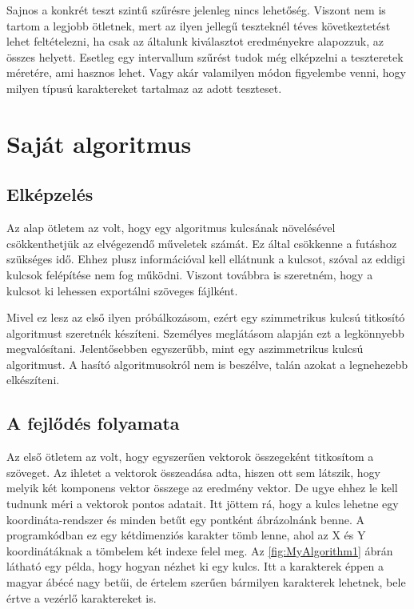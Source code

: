 \documentclass[12pt]{report} %
\begin{document}
Sajnos a konkrét teszt szintű szűrésre jelenleg nincs lehetőség. Viszont nem is tartom a legjobb ötletnek, mert az ilyen jellegű teszteknél téves következtetést lehet feltételezni, ha csak az általunk kiválasztot eredményekre alapozzuk, az összes helyett. Esetleg egy intervallum szűrést tudok még elképzelni a teszteretek méretére, ami hasznos lehet. Vagy akár valamilyen módon figyelembe venni, hogy milyen típusú karaktereket tartalmaz az adott teszteset.

\chapter{Saját algoritmus} %

\section{Elképzelés} %

Az alap ötletem az volt, hogy egy algoritmus kulcsának növelésével csökkenthetjük az elvégezendő műveletek számát. Ez által csökkenne a futáshoz szükséges idő. Ehhez plusz információval kell ellátnunk a kulcsot, szóval az eddigi kulcsok felépítése nem fog működni. Viszont továbbra is szeretném, hogy a kulcsot ki lehessen exportálni szöveges fájlként.

Mivel ez lesz az első ilyen próbálkozásom, ezért egy szimmetrikus kulcsú titkosító algoritmust szeretnék készíteni. Személyes meglátásom alapján ezt a legkönnyebb megvalósítani. Jelentősebben egyszerűbb, mint egy aszimmetrikus kulcsú algoritmust. A hasító algoritmusokról nem is beszélve, talán azokat a legnehezebb elkészíteni.

\section{A fejlődés folyamata} %

Az első ötletem az volt, hogy egyszerűen vektorok összegeként titkosítom a szöveget. Az ihletet a vektorok összeadása adta, hiszen ott sem látszik, hogy melyik két komponens vektor összege az eredmény vektor. De ugye ehhez le kell tudnunk méri a vektorok pontos adatait. Itt jöttem rá, hogy a kulcs lehetne egy koordináta-rendszer és minden betűt egy pontként ábrázolnánk benne. A programkódban ez egy kétdimenziós karakter tömb lenne, ahol az X és Y koordinátáknak a tömbelem két indexe felel meg. Az \ref{fig:MyAlgorithm1} ábrán látható egy példa, hogy hogyan nézhet ki egy kulcs. Itt a karakterek éppen a magyar ábécé nagy betűi, de értelem szerűen bármilyen karakterek lehetnek, bele értve a vezérlő karaktereket is.
\end{document}
